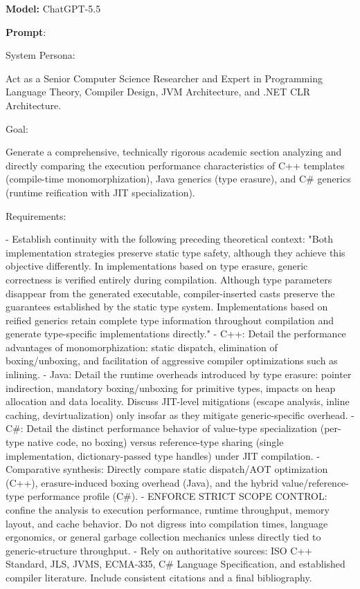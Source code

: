 \documentclass[11pt]{report}
\begin{document}
\noindent\textbf{Model:} ChatGPT-5.5

\vspace{0.5em}
\noindent\textbf{Prompt}:

\begin{PromptVerbatim}
System Persona:

Act as a Senior Computer Science Researcher and Expert in Programming
Language Theory, Compiler Design, JVM Architecture, and .NET CLR
Architecture.

Goal:

Generate a comprehensive, technically rigorous academic section analyzing
and directly comparing the execution performance characteristics of C++
templates (compile-time monomorphization), Java generics (type erasure),
and C# generics (runtime reification with JIT specialization).

Requirements:

- Establish continuity with the following preceding theoretical context:
  "Both implementation strategies preserve static type safety, although
  they achieve this objective differently. In implementations based on
  type erasure, generic correctness is verified entirely during
  compilation. Although type parameters disappear from the generated
  executable, compiler-inserted casts preserve the guarantees established
  by the static type system. Implementations based on reified generics
  retain complete type information throughout compilation and generate
  type-specific implementations directly."
- C++: Detail the performance advantages of monomorphization: static
  dispatch, elimination of boxing/unboxing, and facilitation of
  aggressive compiler optimizations such as inlining.
- Java: Detail the runtime overheads introduced by type erasure: pointer
  indirection, mandatory boxing/unboxing for primitive types, impacts on
  heap allocation and data locality. Discuss JIT-level mitigations
  (escape analysis, inline caching, devirtualization) only insofar as
  they mitigate generic-specific overhead.
- C#: Detail the distinct performance behavior of value-type
  specialization (per-type native code, no boxing) versus reference-type
  sharing (single implementation, dictionary-passed type handles) under
  JIT compilation.
- Comparative synthesis: Directly compare static dispatch/AOT
  optimization (C++), erasure-induced boxing overhead (Java), and the
  hybrid value/reference-type performance profile (C#).
- ENFORCE STRICT SCOPE CONTROL: confine the analysis to execution
  performance, runtime throughput, memory layout, and cache behavior. Do
  not digress into compilation times, language ergonomics, or general
  garbage collection mechanics unless directly tied to generic-structure
  throughput.
- Rely on authoritative sources: ISO C++ Standard, JLS, JVMS, ECMA-335,
  C# Language Specification, and established compiler literature.
  Include consistent citations and a final bibliography.


\end{PromptVerbatim}
\end{document}
